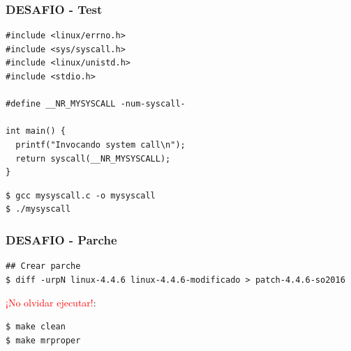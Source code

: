 \begin{frame}[fragile]
\frametitle{DESAFIO - Test}
  \begin{lstlisting}
#include <linux/errno.h>
#include <sys/syscall.h>
#include <linux/unistd.h>
#include <stdio.h>

#define __NR_MYSYSCALL -num-syscall-

int main() {
  printf("Invocando system call\n");
  return syscall(__NR_MYSYSCALL);
}
  \end{lstlisting}
  \begin{lstlisting}
$ gcc mysyscall.c -o mysyscall
$ ./mysyscall
  \end{lstlisting}
\end{frame}

\begin{frame}[fragile]
\frametitle{DESAFIO - Parche}
  \begin{lstlisting}
## Crear parche
$ diff -urpN linux-4.4.6 linux-4.4.6-modificado > patch-4.4.6-so2016
  \end{lstlisting}
  \textcolor{red}{¡No olvidar ejecutar!}:
  \begin{lstlisting}
$ make clean
$ make mrproper
  \end{lstlisting}  
\end{frame}
